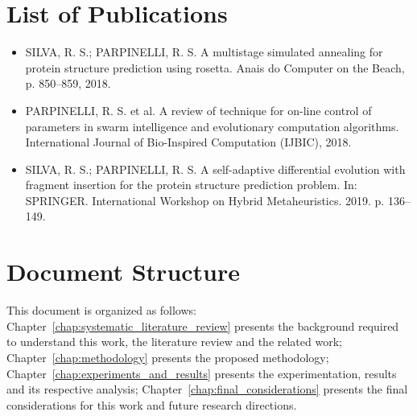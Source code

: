 \section{List of Publications}\label{sec:future_works}

\begin{itemize}
    \item SILVA, R. S.; PARPINELLI, R. S. A multistage simulated annealing for protein structure prediction using rosetta. Anais do Computer on the Beach, p. 850–859, 2018.
    \item PARPINELLI, R. S. et al. A review of technique for on-line control of parameters in swarm intelligence and evolutionary computation algorithms. International Journal of Bio-Inspired Computation (IJBIC), 2018.
    \item SILVA, R. S.; PARPINELLI, R. S. A self-adaptive differential evolution with fragment insertion  for  the  protein  structure  prediction  problem.  In:  SPRINGER. International Workshop on Hybrid Metaheuristics. 2019. p. 136–149.
\end{itemize}

\section{Document Structure} \label{sec:chap1_document_structure}

This document is organized as follows:
Chapter~\ref{chap:systematic_literature_review} presents the background
required to understand this work, the literature review and the related work; Chapter~\ref{chap:methodology} presents the proposed methodology; Chapter~\ref{chap:experiments_and_results} presents the experimentation,
results and its respective analysis;
Chapter~\ref{chap:final_considerations} presents the final considerations for
this work and future research directions.
